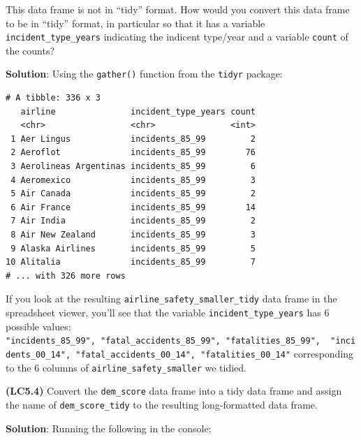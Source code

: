 \documentclass[12pt, krantz2,]{krantz}
\makeatletter
\newenvironment{Shaded}{\begin{snugshade}}{\end{snugshade}}
\newcommand{\DataTypeTok}[1]{\textcolor[rgb]{0.27,0.27,0.27}{#1}}
\newcommand{\KeywordTok}[1]{\textcolor[rgb]{0.27,0.27,0.27}{\textbf{#1}}}
\newcommand{\NormalTok}[1]{#1}
\newcommand{\OperatorTok}[1]{\textcolor[rgb]{0.43,0.43,0.43}{\textbf{#1}}}
\newcommand{\StringTok}[1]{\textcolor[rgb]{0.5,0.5,0.5}{#1}}
\newenvironment{kframe}{%
\medskip{}
\setlength{\fboxsep}{.8em}
 \def\at@end@of@kframe{}%
 \ifinner\ifhmode%
  \def\at@end@of@kframe{\end{minipage}}%
  \begin{minipage}{\columnwidth}%
 \fi\fi%
 \def\FrameCommand##1{\hskip\@totalleftmargin \hskip-\fboxsep
 \colorbox{shadecolor}{##1}\hskip-\fboxsep
     \hskip-\linewidth \hskip-\@totalleftmargin \hskip\columnwidth}%
 \MakeFramed {\advance\hsize-\width
   \@totalleftmargin\z@ \linewidth\hsize
   \@setminipage}}%
 {\par\unskip\endMakeFramed%
 \at@end@of@kframe}
\renewenvironment{Shaded}{\begin{kframe}}{\end{kframe}}
\makeatother
\begin{document}
This data frame is not in ``tidy'' format. How would you convert this data frame to be in ``tidy'' format, in particular so that it has a variable \texttt{incident\_type\_years} indicating the indicent type/year and a variable \texttt{count} of the counts?

\textbf{Solution}: Using the \texttt{gather()} function from the \texttt{tidyr} package:

\begin{Shaded}
\end{Shaded}

\begin{verbatim}
# A tibble: 336 x 3
   airline               incident_type_years count
   <chr>                 <chr>               <int>
 1 Aer Lingus            incidents_85_99         2
 2 Aeroflot              incidents_85_99        76
 3 Aerolineas Argentinas incidents_85_99         6
 4 Aeromexico            incidents_85_99         3
 5 Air Canada            incidents_85_99         2
 6 Air France            incidents_85_99        14
 7 Air India             incidents_85_99         2
 8 Air New Zealand       incidents_85_99         3
 9 Alaska Airlines       incidents_85_99         5
10 Alitalia              incidents_85_99         7
# ... with 326 more rows
\end{verbatim}

If you look at the resulting \texttt{airline\_safety\_smaller\_tidy} data frame in the spreadsheet viewer, you'll see that the variable \texttt{incident\_type\_years} has 6 possible values: \texttt{"incidents\_85\_99",\ "fatal\_accidents\_85\_99",\ "fatalities\_85\_99",\ \ "incidents\_00\_14",\ "fatal\_accidents\_00\_14",\ "fatalities\_00\_14"} corresponding to the 6 columns of \texttt{airline\_safety\_smaller} we tidied.

\textbf{(LC5.4)} Convert the \texttt{dem\_score} data frame into
a tidy data frame and assign the name of \texttt{dem\_score\_tidy} to the resulting long-formatted data frame.

\textbf{Solution}: Running the following in the console:
\end{document}
